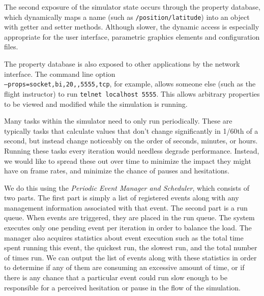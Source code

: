 \documentclass[a4paper,10pt]{article}
\begin{document}
The second exposure of the simulator state occurs through the
property database, which dynamically maps a name (such as 
\texttt{/position/latitude}) into an object with getter
and setter methods.  Although slower, the dynamic access is
especially appropriate for the user interface, parametric graphics
elements and configuration files.

The property database is also exposed
to other applications by the network interface.
The command line option \\
\texttt{--props=socket,bi,20,,5555,tcp},
for example, allows someone else (such as the flight instructor)
to run \texttt{telnet localhost 5555}.  This allows
arbitrary properties to be viewed and modified while
the simulation is running.  

Many tasks within the simulator need to only run periodically. These
are typically tasks that calculate values that don't change
significantly in 1/60th of a second, but instead change noticeably on
the order of seconds, minutes, or hours.
Running these tasks every iteration would needless degrade
performance. Instead, we would like to spread these out over time to
minimize the impact they might have on frame rates, and minimize the
chance of pauses and hesitations.

We do this using the \textsl{Periodic Event Manager and Scheduler},
which consists of two parts. The first part is simply a list
of registered events along with any management information associated
with that event. The second part is a run queue. When events are
triggered, they are placed in the run queue. The system executes only
one pending event per iteration in order to balance the load.
The manager also acquires statistics about event execution
such as the total time spent running this event, the quickest run, the
slowest run, and the total number of times run. We can output the list
of events along with these statistics in order to determine if any of
them are consuming an excessive amount of time, or if there is any
chance that a particular event could run slow enough to be responsible
for a perceived hesitation or pause in the flow of the simulation.
%
%
\end{document}
